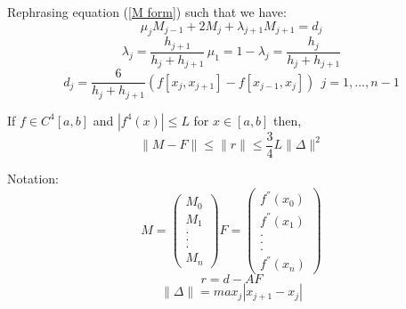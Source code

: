 Rephrasing equation (\ref{M form}) such that we have:
\[\mu_jM_{j-1} +2M_j +\lambda_{j+1}M_{j+1} = d_j \]
\[ \lambda_j = \frac{h_{j+1}}{h_{j}+h_{j+1}} \, \mu_1=1-\lambda_j=\frac{h_j}{h_j+h_{j+1}} \]
\[d_j = \frac{6}{h_j+h_{j+1}}\left(f[x_{j},x_{j+1}]-f[x_{j-1},x_{j}]\right) \ \
j=1,...,n-1 \]
\begin{theorem}
If $f\in C^{4}[a,b]$ and $|f^{4}(x)|\leq L$ for $x \in [a,b]$ then,
\[
\lVert M-F\rVert \leq \lVert r\rVert  \leq \frac{3}{4}L\lVert \Delta\rVert ^{2} \]
\end{theorem}
Notation:
\[
M=\left( \begin{array}{c}
      M_0\\
      M_1\\
      .\\
      .\\
      .\\
      M_n\end{array} \right)
F=
\left( \begin{array}{c}
      f^{''}(x_0)\\
      f^{''}(x_1)\\
      .\\
      .\\
      .\\
      f^{''}(x_n)\end{array} \right)
\]
\[r=d-AF \]
\[\lVert \Delta\rVert =max_j|x_{j+1}-x_{j}| \]

